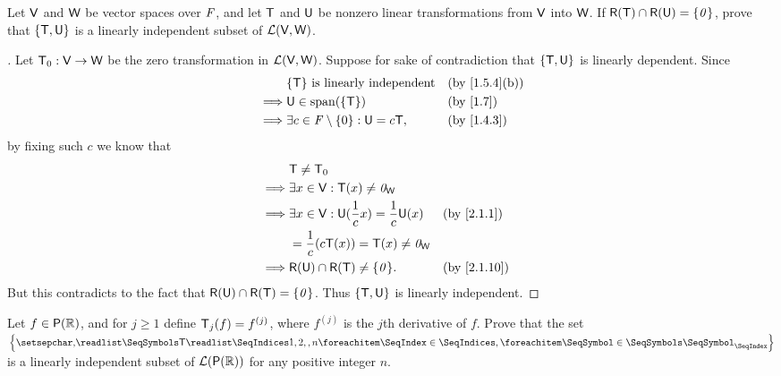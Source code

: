 \begin{ex}\label{ex:2.2.13}
	Let \(\mathsf{V}\) and \(\mathsf{W}\) be vector spaces over \(\mathit{F}\), and let \(\mathsf{T}\) and \(\mathsf{U}\) be nonzero linear transformations from \(\mathsf{V}\) into \(\mathsf{W}\).
	If \(\rg{\T} \cap \rg{\U} = \set{\zv}\), prove that \(\left\lbrace\mathsf{T}, \mathsf{U}\right\rbrace\) is a linearly independent subset of \(\mathcal{L}(\mathsf{V}, \mathsf{W})\).
\end{ex}

\begin{proof}[]
	Let \(\mathsf{T}_0 : \mathsf{V} \to \mathsf{W}\) be the zero transformation in \(\mathcal{L}(\mathsf{V}, \mathsf{W})\).
	Suppose for sake of contradiction that \(\left\lbrace\mathsf{T}, \mathsf{U}\right\rbrace\) is linearly dependent.
	Since
	\begin{align*}
		         & \set{\T} \text{ is linearly independent}        &  & \by{1.5.4}[b] \\
		\implies & \U \in \spn{\set{\T}}                           &  & \by{1.7}      \\
		\implies & \exists c \in \F \setminus \set{0} : \U = c \T, &  & \by{1.4.3}
	\end{align*}
	by fixing such \(c\) we know that
	\begin{align*}
		         & \T \neq \zT                                                               \\
		\implies & \exists x \in \V : \T(x) \neq \zv_{\W}                                    \\
		\implies & \exists x \in \V : \U(\frac{1}{c} x) = \frac{1}{c} \U(x) &  & \by{2.1.1}  \\
		         & = \frac{1}{c} (c \T(x)) = \T(x) \neq \zv_{\W}                             \\
		\implies & \rg{\U} \cap \rg{\T} \neq \set{\zv}.                     &  & \by{2.1.10}
	\end{align*}
	But this contradicts to the fact that \(\rg{\U} \cap \rg{\T} = \set{\zv}\).
	Thus \(\left\lbrace\mathsf{T}, \mathsf{U}\right\rbrace\) is linearly independent.
\end{proof}

\begin{ex}\label{ex:2.2.14}
	Let \(f \in \ps{\R}\), and for \(j \geq 1\) define \(\mathsf{T}_j(f) = f^{(j)}\), where \(f^{(j)}\) is the \(j\)th derivative of \(f\).
	Prove that the set \(\set{\seq{\T}{1,2,,n}}\) is a linearly independent subset of \(\ls(\ps{\R})\) for any positive integer \(n\).
\end{ex}

